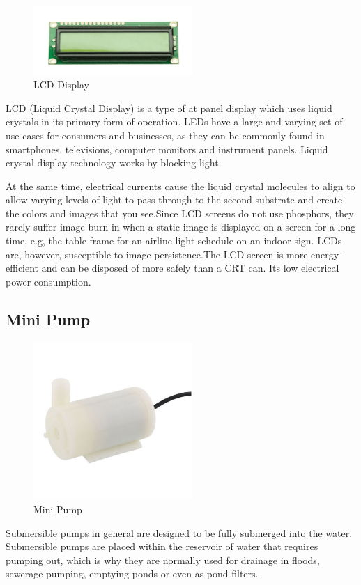 	\begin{figure}[h]
		\centering
	\includegraphics[width=60mm,scale=1]{46}
	\caption{LCD Display}
	\label{LCD Display}
	
\end{figure}

 LCD (Liquid Crystal Display) is a type of at panel display which uses liquid crystals in its primary form of operation. LEDs have a large and varying set of use cases for consumers and businesses, as they can be commonly found in smartphones, televisions, computer monitors and instrument panels. Liquid crystal display technology works by blocking light.
  
 At the same time, electrical currents cause the liquid crystal molecules to align to allow varying levels of light to pass through to the second substrate and create the colors and images that you see.Since LCD screens do not use phosphors, they rarely suffer image burn-in when a static image is displayed on a screen for a long time, e.g, the table frame for an airline light schedule on an indoor sign. LCDs are, however, susceptible to image persistence.The LCD screen is more energy-efficient and can be disposed of more safely than a CRT can. Its low electrical power consumption.
 
\newpage

\subsection{Mini Pump}

	\begin{figure}[h]
		\centering
	\includegraphics[width=60mm,scale=1]{47}
	\caption{Mini Pump}
	\label{Mini Pump}
	
\end{figure}
Submersible pumps in general are designed to be fully submerged into the water. Submersible pumps are placed within the reservoir of water that requires pumping out, which is why they are normally used for drainage in floods, sewerage pumping, emptying ponds or even as pond filters.

